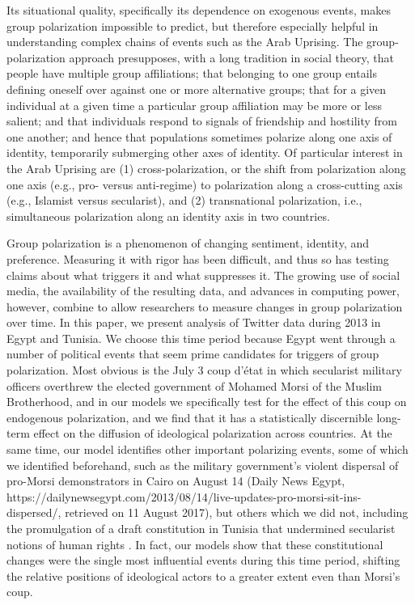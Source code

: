 \documentclass[12pt]{article}
\begin{document}
Its situational quality, specifically its dependence on exogenous events, makes group polarization impossible to predict, but therefore especially helpful in understanding complex chains of events such as the Arab Uprising.  The group-polarization approach presupposes, with a long tradition in social theory, that people have multiple group affiliations; that belonging to one group entails defining oneself over against one or more alternative groups; that for a given individual at a given time a particular group affiliation may be more or less salient; and that individuals respond to signals of friendship and hostility from one another; and hence that populations sometimes polarize along one axis of identity, temporarily submerging other axes of identity.  Of particular interest in the Arab Uprising are (1) cross-polarization, or the shift from polarization along one axis (e.g., pro- versus anti-regime) to polarization along a cross-cutting axis (e.g., Islamist versus secularist), and (2) transnational polarization, i.e., simultaneous polarization along an identity axis in two countries.

Group polarization is a phenomenon of changing sentiment, identity, and preference.  Measuring it with rigor has been difficult, and thus so has testing claims about what triggers it and what suppresses it.  The growing use of social media, the availability of the resulting data, and advances in computing power, however, combine to allow researchers to measure changes in group polarization over time.  In this paper, we present analysis of Twitter data during 2013 in Egypt and Tunisia.  We choose this time period because Egypt went through a number of political events that seem prime candidates for triggers of group polarization.  Most obvious is the July 3 coup d'état in which secularist military officers overthrew the elected government of Mohamed Morsi of the Muslim Brotherhood, and in our models we specifically test for the effect of this coup on endogenous polarization, and we find that it has a statistically discernible long-term effect on the diffusion of ideological polarization across countries. At the same time, our model identifies other important polarizing events, some of which we identified beforehand, such as the military government's violent dispersal of pro-Morsi demonstrators in Cairo on August 14 (Daily News Egypt, https://dailynewsegypt.com/2013/08/14/live-updates-pro-morsi-sit-ins-dispersed/, retrieved on 11 August 2017), but others which we did not, including the promulgation of a draft constitution in Tunisia that undermined secularist notions of human rights \parencite{hrw2013}. In fact, our models show that these constitutional changes were the single most influential events during this time period, shifting the relative positions of ideological actors to a greater extent even than Morsi's coup.
\end{document}

